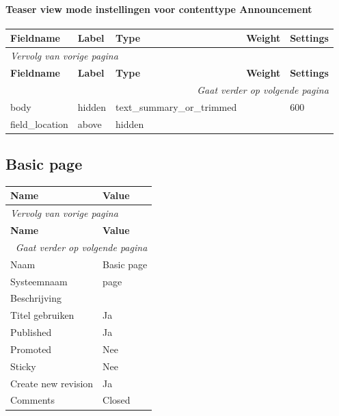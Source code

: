 \paragraph{Teaser view mode instellingen voor contenttype Announcement }

  \begin{longtable}{| p{3.00cm}|p{3.00cm}|p{3.00cm}|p{3.00cm}|p{3.00cm}|}
  \hline
  \rowcolor{tableheader}
  \textbf{Fieldname} & \textbf{Label} & \textbf{Type} & \textbf{Weight} & \textbf{Settings}  \tabularnewline
  \hline
\endfirsthead
\multicolumn{5}{l}{\textit{Vervolg van vorige pagina}} \\
\hline
\rowcolor{tableheader}
  \textbf{Fieldname} & \textbf{Label} & \textbf{Type} & \textbf{Weight} & \textbf{Settings}  \tabularnewline
  \hline
\hline
\endhead
\multicolumn{5}{r}{\textit{Gaat verder op volgende pagina}} \\
\endfoot
\hline
\endlastfoot
  body & hidden & text\_summary\_or\_trimmed &   & 600  \tabularnewline
  \hline
  field\_location & above & hidden &   &    \tabularnewline
  \hline
  \end{longtable}

\subsection{Basic page}
\label{sec:content-basic page}
  \begin{longtable}{| p{7.50cm}|p{7.50cm}|}
  \hline
  \rowcolor{tableheader}
  \textbf{Name} & \textbf{Value}  \tabularnewline
  \hline
\endfirsthead
\multicolumn{2}{l}{\textit{Vervolg van vorige pagina}} \\
\hline
\rowcolor{tableheader}
  \textbf{Name} & \textbf{Value}  \tabularnewline
  \hline
\hline
\endhead
\multicolumn{2}{r}{\textit{Gaat verder op volgende pagina}} \\
\endfoot
\hline
\endlastfoot
  Naam & Basic page  \tabularnewline
  \hline
  Systeemnaam & page  \tabularnewline
  \hline
  Beschrijving &   \tabularnewline
  \hline
  Titel gebruiken & Ja  \tabularnewline
  \hline
  Published & Ja  \tabularnewline
  \hline
  Promoted & Nee  \tabularnewline
  \hline
  Sticky & Nee  \tabularnewline
  \hline
  Create new revision & Ja  \tabularnewline
  \hline
  Comments & Closed  \tabularnewline
  \hline
  \end{longtable}

